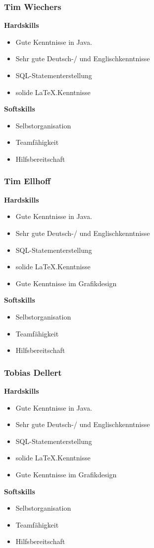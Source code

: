 \documentclass[fontsize=12pt,paper=a4,twoside]{scrartcl}
\begin{document}
\subsubsection{Tim Wiechers}

\textbf{Hardskills}
\begin{itemize}
\item{Gute Kenntnisse in Java.}
\item{Sehr gute Deutsch-/ und Englischkenntnisse}
\item{SQL-Statementerstellung}
\item{solide \LaTeX.Kenntnisse}
\end{itemize}
\textbf{Softskills}
\begin{itemize}
\item{Selbstorganisation}
\item{Teamfähigkeit}
\item{Hilfsbereitschaft}
\end{itemize}

\subsubsection{Tim Ellhoff}

\textbf{Hardskills}
\begin{itemize}
\item{Gute Kenntnisse in Java.}
\item{Sehr gute Deutsch-/ und Englischkenntnisse}
\item{SQL-Statementerstellung}
\item{solide \LaTeX.Kenntnisse}
\item{Gute Kenntnisse im Grafikdesign}
\end{itemize}
\textbf{Softskills}
\begin{itemize}
\item{Selbstorganisation}
\item{Teamfähigkeit}
\item{Hilfsbereitschaft}
\end{itemize}

\subsubsection{Tobias Dellert}

\textbf{Hardskills}
\begin{itemize}
\item{Gute Kenntnisse in Java.}
\item{Sehr gute Deutsch-/ und Englischkenntnisse}
\item{SQL-Statementerstellung}
\item{solide \LaTeX.Kenntnisse}
\item{Gute Kenntnisse im Grafikdesign}
\end{itemize}
\textbf{Softskills}
\begin{itemize}
\item{Selbstorganisation}
\item{Teamfähigkeit}
\item{Hilfsbereitschaft}
\end{itemize}
\end{document}
